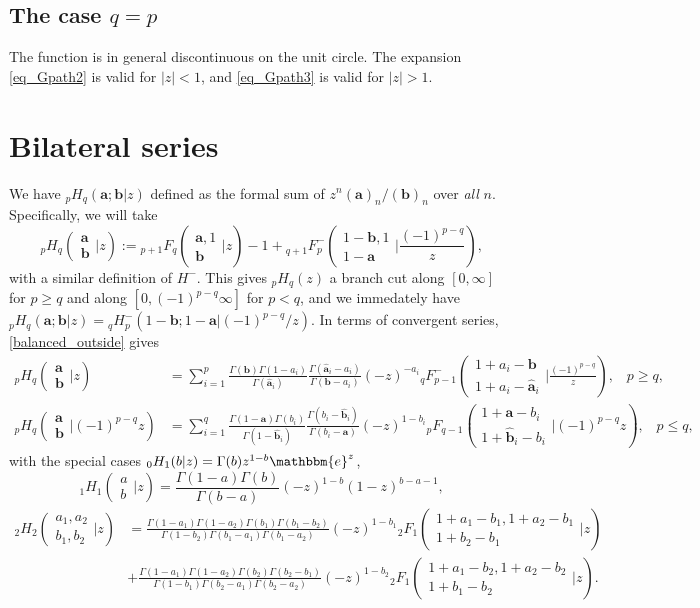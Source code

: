 \documentclass[12pt]{article}
\newcommand{\ee}[0] {\mathbbm{e}}
\numberwithin{equation}{section}
\newcommand{\FF}[6] {{}_{#1}{#2}_{#3} \left( \begin{array}{c} #4 \\ #5 \end{array} \Big| {#6}  \right)}
\newcommand{\FFe}[7] {{}_{#1}^{\,}{#2}_{#3}^{#4} \left( \begin{array}{c} #5 \\ #6 \end{array} \Big| {#7} \right)}
\newcommand{\bfa}[0] {\mathbf{a}}
\newcommand{\bfb}[0] {\mathbf{b}}
\begin{document}
\subsection{The case $q=p$}
The function is in general discontinuous on the unit circle. The expansion \eqref{eq_Gpath2} is valid for $|z| < 1$, and \eqref{eq_Gpath3} is valid for $|z| > 1$.



\section{Bilateral series}
We have ${}_p H_q(\bfa; \bfb|z)$ defined as the formal sum of $z^n (\bfa)_n/(\bfb)_n$ over \emph{all} $n$. Specifically, we will take
\begin{equation*}
\FF{p}{H}{q}{\bfa}{\bfb}{z} := \FF{p+1}{F}{q}{\bfa,1}{\bfb}{z}-1 + \FFe{q+1}{F}{p}{-}{1-\bfb,1}{1-\bfa}{\frac{(-1)^{p-q}}{z}} \text{,}
\end{equation*}
with a similar definition of $H^{-}$. This gives ${}_p H_q(z)$ a branch cut along $[0,\infty]$ for $p\ge q$ and along $[0,(-1)^{p-q} \infty]$ for $p < q$, and we immedately have ${}_p H_q (\bfa; \bfb | z) = {}_q H_p^{-} (1-\bfb; 1-\bfa | (-1)^{p-q}/z)$. In terms of convergent series, \eqref{balanced_outside} gives
\begin{align*}
\FF{p}{H}{q}{\bfa}{\bfb}{z} &= \sum_{i=1}^p \frac{\Gamma(\bfb)\Gamma(1-a_i)}{\Gamma(\hat{\bfa}_i)}\frac{\Gamma(\hat{\bfa}_i-a_i)}{\Gamma(\bfb-a_i)} (-z)^{-a_i} \FFe{q}{F}{p-1}{-}{1+a_i-\bfb}{1+a_i-\hat{\bfa}_i}{\frac{(-1)^{p-q}}{z}}\text{,} \quad p \ge q \text{,}\\
\FF{p}{H}{q}{\bfa}{\bfb}{(-1)^{p-q}z} &= \sum_{i=1}^q \frac{\Gamma(1-\bfa)\Gamma(b_i)}{\Gamma(1-\hat{\bfb}_i)}\frac{\Gamma(b_i-\hat{\bfb}_i)}{\Gamma(b_i-\bfa)} (-z)^{1-b_i} \FF{p}{F}{q-1}{1+\bfa-b_i}{1+\hat{\bfb}_i-b_i}{(-1)^{p-q}z}\text{,} \quad p \le q \text{,}
\end{align*}
with the special cases ${}_0 H_1(b|z) = \Gamma(b) z^{1-b} \ee^{z}$,
 \begin{equation}
\label{equ_1H1}
\FF{1}{H}{1}{a}{b}{z} = \frac{\Gamma(1-a)\Gamma(b)}{\Gamma(b-a)} (-z)^{1-b}(1-z)^{b-a-1}\text{,}
\end{equation}
\begin{equation}
\label{equ_2H2}
\begin{aligned}
\FF{2}{H}{2}{a_1,a_2}{b_1,b_2}{z} &= \frac{\Gamma(1-a_1)\Gamma(1-a_2)\Gamma(b_1)\Gamma(b_1-b_2)}{\Gamma(1-b_2)\Gamma(b_1-a_1)\Gamma(b_1-a_2)} (-z)^{1-b_1} \FF{2}{F}{1}{1+a_1-b_1,1+a_2-b_1}{1+b_2-b_1}{z}\\
&+ \frac{\Gamma(1-a_1)\Gamma(1-a_2)\Gamma(b_2)\Gamma(b_2-b_1)}{\Gamma(1-b_1)\Gamma(b_2-a_1)\Gamma(b_2-a_2)} (-z)^{1-b_2} \FF{2}{F}{1}{1+a_1-b_2,1+a_2-b_2}{1+b_1-b_2}{z}\text{.}
\end{aligned}
\end{equation}
\end{document}
